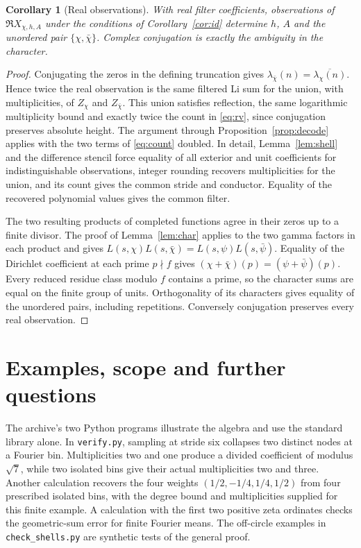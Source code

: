 \documentclass[11pt]{article}
\newtheorem{corollary}[theorem]{Corollary}
\begin{document}
\begin{corollary}[Real observations]\label{cor:real}
With real filter coefficients, observations of $\Re X_{\chi,h,A}$ under the conditions of Corollary~\ref{cor:id} determine $h$, $A$ and the unordered pair $\{\chi,\bar\chi\}$. Complex conjugation is exactly the ambiguity in the character.
\end{corollary}
\begin{proof}
Conjugating the zeros in the defining truncation gives $\lambda_{\bar\chi}(n)=\overline{\lambda_\chi(n)}$. Hence twice the real observation is the same filtered Li sum for the union, with multiplicities, of $Z_\chi$ and $Z_{\bar\chi}$. This union satisfies reflection, the same logarithmic multiplicity bound and exactly twice the count in \eqref{eq:rv}, since conjugation preserves absolute height. The argument through Proposition~\ref{prop:decode} applies with the two terms of \eqref{eq:count} doubled. In detail, Lemma~\ref{lem:shell} and the difference stencil force equality of all exterior and unit coefficients for indistinguishable observations, integer rounding recovers multiplicities for the union, and its count gives the common stride and conductor. Equality of the recovered polynomial values gives the common filter.

The two resulting products of completed functions agree in their zeros up to a finite divisor. The proof of Lemma~\ref{lem:char} applies to the two gamma factors in each product and gives $L(s,\chi)L(s,\bar\chi)=L(s,\psi)L(s,\bar\psi)$. Equality of the Dirichlet coefficient at each prime $p\nmid f$ gives $(\chi+\bar\chi)(p)=(\psi+\bar\psi)(p)$. Every reduced residue class modulo $f$ contains a prime, so the character sums are equal on the finite group of units. Orthogonality of its characters gives equality of the unordered pairs, including repetitions. Conversely conjugation preserves every real observation.
\end{proof}


\section{Examples, scope and further questions}
The archive's two Python programs illustrate the algebra and use the standard library alone. In \texttt{verify.py}, sampling at stride six collapses two distinct nodes at a Fourier bin. Multiplicities two and one produce a divided coefficient of modulus $\sqrt7$, while two isolated bins give their actual multiplicities two and three. Another calculation recovers the four weights $(1/2,-1/4,1/4,1/2)$ from four prescribed isolated bins, with the degree bound and multiplicities supplied for this finite example. A calculation with the first two positive zeta ordinates checks the geometric-sum error for finite Fourier means. The off-circle examples in \texttt{check\_shells.py} are synthetic tests of the general proof.
\end{document}
